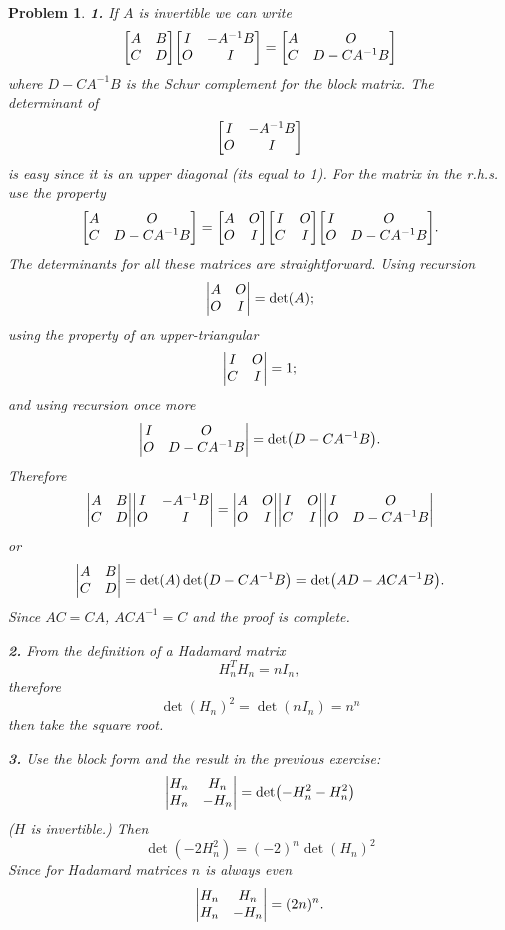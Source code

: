 \documentclass{article}
\newcommand{\subno}[1]{\par\noindent\textbf{#1}}
\theoremstyle{pprop}
\newtheorem{problem}{Problem}[section]
\begin{document}
\begin{problem}
  \subno{1.}
  If $A$ is invertible we can write 
  \[
  \mqty[A & B \\ C & D ] \mqty[I & - A^{-1}B \\ O & I ]
  =
  \mqty[A & O \\ C & D -C A^{-1}B]
  \]
  where $D-C A^{-1}B$ is the \emph{Schur complement} for the block matrix. The determinant of 
  \[
  \mqty[I & - A^{-1}B \\ O & I ]
  \]
  is easy since it is an upper diagonal (its equal to 1). For the matrix in the r.h.s. use the property 
  \[
  \mqty[A & O \\ C & D -C A^{-1}B]
  =
  \mqty[A & O \\ O & I]
  \mqty[I & O \\ C & I]
  \mqty[I & O \\ O & D -C A^{-1}B].
  \]
  The determinants for all these matrices are straightforward. Using recursion 
  \[
  \mqty|A & O \\ O & I|=\det(A);  
  \] 
  using the property of an upper-triangular 
  \[
  \mqty|I & O \\ C & I|=1;  
  \]
  and using recursion once more 
  \[
  \mqty|I & O \\ O & D -C A^{-1}B|=\det(D -C A^{-1}B).  
  \]
  Therefore 
  \[
  \mqty|A & B \\ C & D | \mqty|I & - A^{-1}B \\ O & I | 
  = \mqty|A & O \\ O & I| \mqty|I & O \\ C & I| \mqty|I & O \\ O & D -C A^{-1}B|
  \]
  or
  \[
  \mqty|A & B \\ C & D | = \det(A)\det(D-CA^{-1}B)=\det(AD-ACA^{-1}B).
  \]
  Since $AC=CA$, $ACA^{-1}=C$ and the proof is complete.
  \subno{2.} From the definition of a Hadamard matrix 
  \[
  H_n^T H_n = nI_n,
  \]
  therefore 
  \[
  \det(H_n)^2=\det(nI_n)=n^n
  \]
  then take the square root.
  \subno{3.} Use the block form and the result in the previous exercise:
\[
\mqty| H_n & H_n \\ H_n & - H_n| =\det(-H_n^2-H_n^2)
\]
($H$ is invertible.)
Then 
\[
\det(-2H_n^2)=(-2)^n\det(H_n)^2 
\]
Since for Hadamard matrices $n$ is always even 
\[
\mqty| H_n & H_n \\ H_n & - H_n| = (2n)^n.
\]

\end{problem}
 
 
\end{document}
